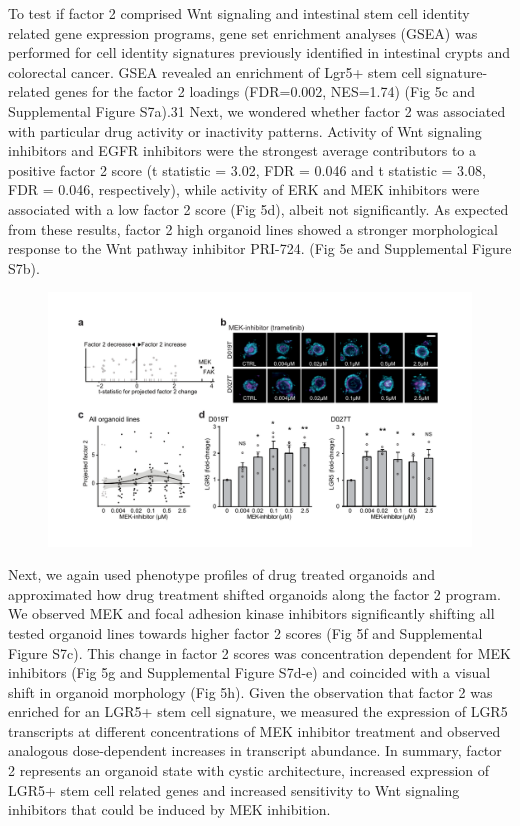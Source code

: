 \begin{flushleft}
To test if factor 2 comprised Wnt signaling and intestinal stem cell identity related gene expression programs, gene set enrichment analyses (GSEA) was performed for cell identity signatures previously identified in intestinal crypts and colorectal cancer. GSEA revealed an enrichment of Lgr5+ stem cell signature-related genes for the factor 2 loadings (FDR=0.002, NES=1.74) (Fig 5c and Supplemental Figure S7a).31 Next, we wondered whether factor 2 was associated with particular drug activity or inactivity patterns. Activity of Wnt signaling inhibitors and EGFR inhibitors were the strongest average contributors to a positive factor 2 score (t statistic = 3.02, FDR = 0.046 and t statistic = 3.08, FDR = 0.046, respectively), while activity of ERK and MEK inhibitors were associated with a low factor 2 score (Fig 5d), albeit not significantly. As expected from these results, factor 2 high organoid lines showed a stronger morphological response to the Wnt pathway inhibitor PRI-724. (Fig 5e and Supplemental Figure S7b).




\begin{figure}[h]
\centering
\includegraphics[width=\textwidth,
                height=\textheight,
                keepaspectratio]{figures/promise/pdf/fig_5_3.pdf}
\caption{}
\label{fig_253}
\end{figure}
\bigbreak

Next, we again used phenotype profiles of drug treated organoids and approximated how drug treatment shifted organoids along the factor 2 program. We observed MEK and focal adhesion kinase inhibitors significantly shifting all tested organoid lines towards higher factor 2 scores (Fig 5f and Supplemental Figure S7c). This change in factor 2 scores was concentration dependent for MEK inhibitors (Fig 5g and Supplemental Figure S7d-e) and coincided with a visual shift in organoid morphology (Fig 5h). Given the observation that factor 2 was enriched for an LGR5+ stem cell signature, we measured the expression of LGR5 transcripts at different concentrations of MEK inhibitor treatment and observed analogous dose-dependent increases in transcript abundance. In summary, factor 2 represents an organoid state with cystic architecture, increased expression of LGR5+ stem cell related genes and increased sensitivity to Wnt signaling inhibitors that could be induced by MEK inhibition.

\end{flushleft}